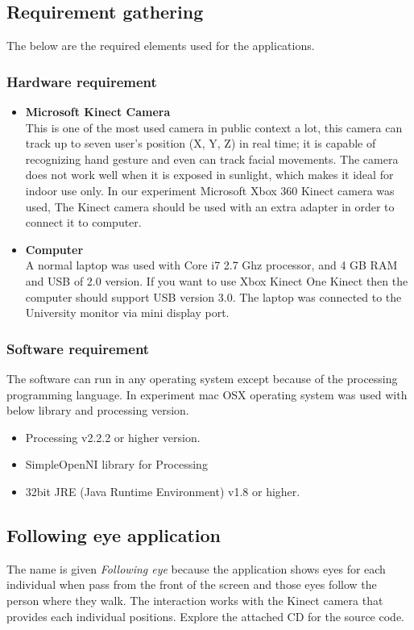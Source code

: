 \subsection{Requirement gathering}
The below are the required elements used for the applications.


\subsubsection{Hardware requirement}

\begin{itemize}
\item \textbf{Microsoft Kinect Camera} \cite{Kinect} \\
This is one of the most used camera in public context a lot, this camera can track up to seven user's position (X, Y, Z) in real time; it is capable of recognizing hand gesture and even can track facial movements. The camera does not work well when it is exposed in sunlight, which makes it ideal for indoor use only. In our experiment Microsoft Xbox 360 Kinect camera was used, The Kinect camera should be used with an extra adapter in order to connect it to computer. 
\item \textbf{Computer} \\
A normal laptop was used with Core i7 2.7 Ghz processor, and 4 GB RAM and USB of 2.0 version.
If you want to use Xbox Kinect One Kinect then the computer should support USB version 3.0.
The laptop was connected to the University monitor via mini display port.

\end{itemize}


\subsubsection{Software requirement}
The software can run in any operating system except because of the processing programming language. In experiment mac OSX operating system was used with below library and processing version.
\begin{itemize}
\item Processing v2.2.2 or higher version.
\item SimpleOpenNI library for Processing \cite{simpleopenni}
\item 32bit JRE (Java Runtime Environment) v1.8 or higher.
\end{itemize}


\subsection{Following eye application}
The name is given \emph{Following eye} because the application shows eyes for each individual when pass from the front of the screen and those eyes follow the person where they walk. The interaction works with the Kinect camera that provides each individual positions.
Explore the attached CD for the source code.

